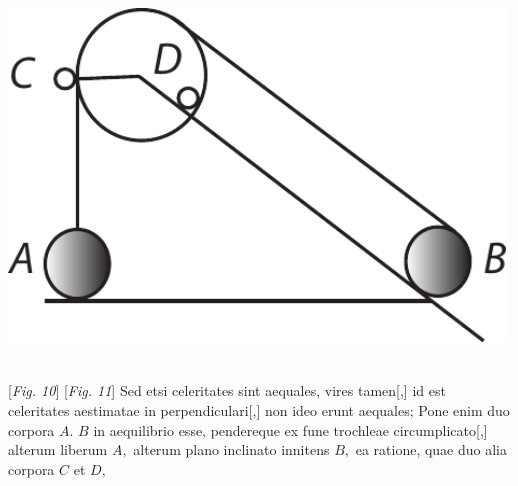 \hspace*{26,9mm}
\begin{minipage}[t]{0.3\textwidth}
\includegraphics[trim = 0mm -3mm 0mm 0mm, clip, width=0.99\textwidth]{images/LH035,14,02_114v-d2.pdf}
\end{minipage}\\
\hspace*{28mm} [\textit{Fig. 10}]\hspace*{51mm} [\textit{Fig. 11}]
\pend
\vspace*{2.5em}
\pstart
Sed etsi celeritates sint aequales,
vires\protect{} tamen[,]
id est celeritates aestimatae in perpendiculari[,]
non ideo erunt aequales;
Pone enim duo corpora $\displaystyle A.$ $\displaystyle B$ in aequilibrio esse,
pendereque ex fune trochleae circumplicato[,] alterum liberum $\displaystyle A,$
alterum plano inclinato\protect{} innitens $\displaystyle B,$
ea  ratione,
quae 
duo alia corpora $\displaystyle C$ et $\displaystyle D,$
